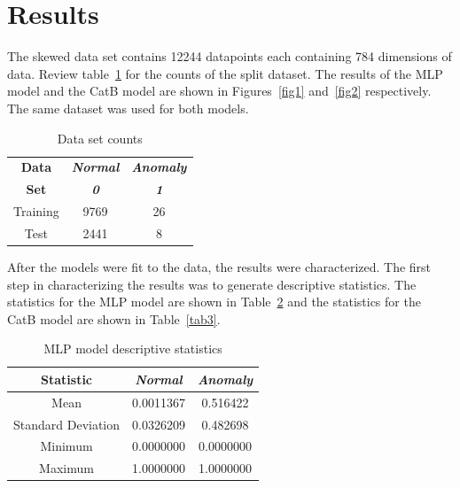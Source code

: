 \section{Results}

The skewed data set contains 12244 datapoints each containing 784 dimensions of data. 
Review table~\ref{tab1} for the counts of the split dataset. 
The results of the MLP model and the CatB model are shown in Figures~\ref{fig1} and~\ref{fig2} respectively.
The same dataset was used for both models.

\begin{table}[htbp]
    \caption{Data set counts}\label{tab1}
    \begin{center}
        \begin{tabular}{c c c}
            \toprule            
            \textbf{Data}  & \textbf{\textit{Normal}}           & \textbf{\textit{Anomaly}} \\
            \textbf{Set}  & \textbf{\textit{0}}           & \textbf{\textit{1}} \\
            \midrule
            Training  & 9769 & 26 \\
            Test & 2441 & 8 \\
            \bottomrule           
        \end{tabular}
    \end{center}
\end{table}

After the models were fit to the data, the results were characterized. The first step in characterizing the results was to generate descriptive statistics.
The statistics for the MLP model are shown in Table~\ref{tab2} and the statistics for the CatB model are shown in Table~\ref{tab3}.

\begin{table}[htbp]
    \caption{MLP model descriptive statistics}\label{tab2}
    \begin{center}
        \begin{tabular}{c c c}
            \toprule            
            \textbf{Statistic}  & \textbf{\textit{Normal}}& \textbf{\textit{Anomaly}} \\
            \midrule
            Mean  & 0.0011367 & 0.516422\\
            Standard Deviation & 0.0326209 & 0.482698\\
            Minimum & 0.0000000 & 0.0000000 \\
            Maximum & 1.0000000 & 1.0000000\\
            \bottomrule
        \end{tabular}
    \end{center}
\end{table}

